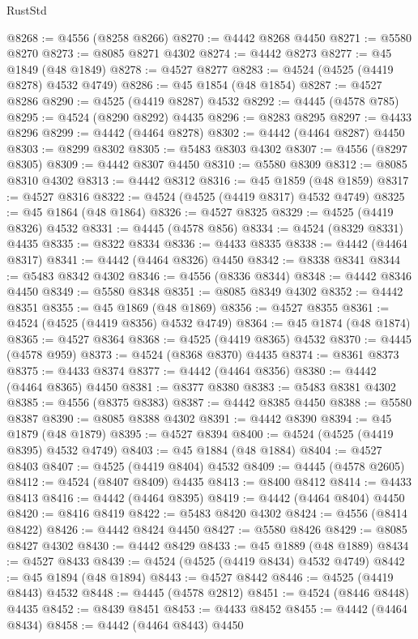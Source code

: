 \begin{lexlean}{RustStd}
\begin{coremodule}
@8268 := @4556 (@8258 @8266)
@8270 := @4442 @8268 @4450
@8271 := @5580 @8270
@8273 := @8085 @8271 @4302
@8274 := @4442 @8273
@8277 := @45 @1849 (@48 @1849)
@8278 := @4527 @8277
@8283 := @4524 (@4525 (@4419 @8278) @4532 @4749)
@8286 := @45 @1854 (@48 @1854)
@8287 := @4527 @8286
@8290 := @4525 (@4419 @8287) @4532
@8292 := @4445 (@4578 @785)
@8295 := @4524 (@8290 @8292) @4435
@8296 := @8283 @8295
@8297 := @4433 @8296
@8299 := @4442 (@4464 @8278)
@8302 := @4442 (@4464 @8287) @4450
@8303 := @8299 @8302
@8305 := @5483 @8303 @4302
@8307 := @4556 (@8297 @8305)
@8309 := @4442 @8307 @4450
@8310 := @5580 @8309
@8312 := @8085 @8310 @4302
@8313 := @4442 @8312
@8316 := @45 @1859 (@48 @1859)
@8317 := @4527 @8316
@8322 := @4524 (@4525 (@4419 @8317) @4532 @4749)
@8325 := @45 @1864 (@48 @1864)
@8326 := @4527 @8325
@8329 := @4525 (@4419 @8326) @4532
@8331 := @4445 (@4578 @856)
@8334 := @4524 (@8329 @8331) @4435
@8335 := @8322 @8334
@8336 := @4433 @8335
@8338 := @4442 (@4464 @8317)
@8341 := @4442 (@4464 @8326) @4450
@8342 := @8338 @8341
@8344 := @5483 @8342 @4302
@8346 := @4556 (@8336 @8344)
@8348 := @4442 @8346 @4450
@8349 := @5580 @8348
@8351 := @8085 @8349 @4302
@8352 := @4442 @8351
@8355 := @45 @1869 (@48 @1869)
@8356 := @4527 @8355
@8361 := @4524 (@4525 (@4419 @8356) @4532 @4749)
@8364 := @45 @1874 (@48 @1874)
@8365 := @4527 @8364
@8368 := @4525 (@4419 @8365) @4532
@8370 := @4445 (@4578 @959)
@8373 := @4524 (@8368 @8370) @4435
@8374 := @8361 @8373
@8375 := @4433 @8374
@8377 := @4442 (@4464 @8356)
@8380 := @4442 (@4464 @8365) @4450
@8381 := @8377 @8380
@8383 := @5483 @8381 @4302
@8385 := @4556 (@8375 @8383)
@8387 := @4442 @8385 @4450
@8388 := @5580 @8387
@8390 := @8085 @8388 @4302
@8391 := @4442 @8390
@8394 := @45 @1879 (@48 @1879)
@8395 := @4527 @8394
@8400 := @4524 (@4525 (@4419 @8395) @4532 @4749)
@8403 := @45 @1884 (@48 @1884)
@8404 := @4527 @8403
@8407 := @4525 (@4419 @8404) @4532
@8409 := @4445 (@4578 @2605)
@8412 := @4524 (@8407 @8409) @4435
@8413 := @8400 @8412
@8414 := @4433 @8413
@8416 := @4442 (@4464 @8395)
@8419 := @4442 (@4464 @8404) @4450
@8420 := @8416 @8419
@8422 := @5483 @8420 @4302
@8424 := @4556 (@8414 @8422)
@8426 := @4442 @8424 @4450
@8427 := @5580 @8426
@8429 := @8085 @8427 @4302
@8430 := @4442 @8429
@8433 := @45 @1889 (@48 @1889)
@8434 := @4527 @8433
@8439 := @4524 (@4525 (@4419 @8434) @4532 @4749)
@8442 := @45 @1894 (@48 @1894)
@8443 := @4527 @8442
@8446 := @4525 (@4419 @8443) @4532
@8448 := @4445 (@4578 @2812)
@8451 := @4524 (@8446 @8448) @4435
@8452 := @8439 @8451
@8453 := @4433 @8452
@8455 := @4442 (@4464 @8434)
@8458 := @4442 (@4464 @8443) @4450

\end{coremodule}
\end{lexlean}
